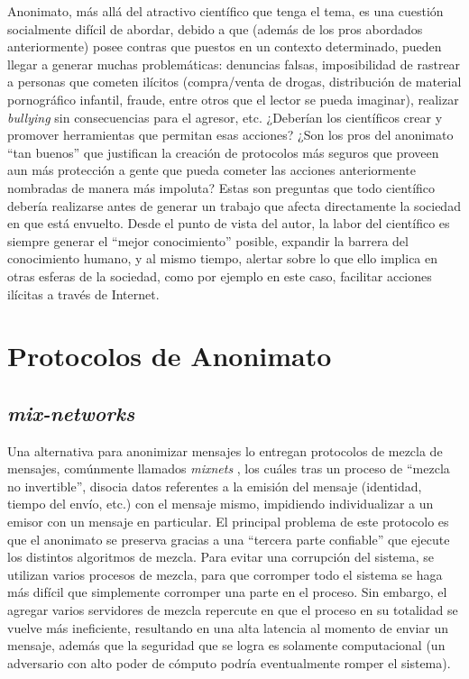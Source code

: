 Anonimato, más allá del atractivo científico que tenga el tema, es una cuestión socialmente difícil de abordar, debido a que 
(además de los pros abordados anteriormente) posee contras que puestos en un contexto determinado, pueden llegar a generar 
muchas problemáticas: denuncias falsas, imposibilidad de rastrear a personas que cometen ilícitos (compra/venta de drogas, 
distribución de material pornográfico infantil, fraude, entre otros que el lector se pueda imaginar), realizar \emph{bullying} 
sin consecuencias para el agresor, etc. ¿Deberían los científicos crear y promover herramientas que permitan esas acciones? 
¿Son los pros del anonimato ``tan buenos'' que justifican la creación de protocolos más seguros que proveen aun más protección 
a gente que pueda cometer las acciones anteriormente nombradas de manera más impoluta? Estas son preguntas que todo científico 
debería realizarse antes de generar un trabajo que afecta directamente la sociedad en que está envuelto. Desde el punto de vista 
del autor, la labor del científico es siempre generar el ``mejor conocimiento'' posible, expandir la barrera del conocimiento 
humano, y al mismo tiempo, alertar sobre lo que ello implica en otras esferas de la sociedad, como por ejemplo en este caso, 
facilitar acciones ilícitas a través de Internet. 

\section{Protocolos de Anonimato}

\subsection{\emph{mix-networks}}

Una alternativa para anonimizar mensajes lo entregan protocolos de mezcla de mensajes, comúnmente llamados \emph{mixnets} 
\cite{chaum1981untraceable}, los cuáles tras un proceso de ``mezcla no invertible'', disocia datos referentes a la emisión del 
mensaje (identidad, tiempo del envío, etc.) con el mensaje mismo, impidiendo individualizar a un emisor con un mensaje en particular. 
El principal problema de este protocolo es que el anonimato se preserva gracias a una ``tercera parte confiable'' que ejecute los 
distintos algoritmos de mezcla. Para evitar una corrupción del sistema, se utilizan varios procesos de mezcla, para que corromper 
todo el sistema se haga más difícil que simplemente corromper una parte en el proceso. Sin embargo, el agregar varios servidores de 
mezcla repercute en que el proceso en su totalidad se vuelve más ineficiente, resultando en una alta latencia al momento de enviar 
un mensaje, además que la seguridad que se logra es solamente computacional (un adversario con alto poder de cómputo podría 
eventualmente romper el sistema).


